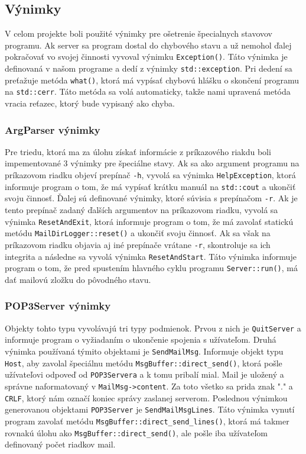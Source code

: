 \documentclass[a4paper, 11pt]{article}
\begin{document}
	
	\subsection{Výnimky}
	V celom projekte boli použité výnimky pre ošetrenie špecialnych stavovov programu. Ak server sa program dostal do chybového stavu a už nemohol ďalej pokračovať vo svojej činnosti vyvoval výnimku {\tt Exception()}. Táto výnimka je definovaná v našom programe a dedí z výnimky {\tt std::exception}. Pri dedení sa preťažuje metóda {\tt what()}, ktorá má vypísať chybovú hlášku o skončení programu na {\tt std::cerr}. Táto metóda sa volá automaticky, takže nami upravená metóda vracia reťazec, ktorý bude vypisaný ako chyba.
	
		\subsubsection{ArgParser výnimky}
		Pre triedu, ktorá ma za úlohu získať informácie z príkazového riakdu boli impementované 3 výnimky pre špeciálne stavy. Ak sa ako argument programu na príkazovom riadku objeví prepínač {\tt -h}, vyvolá sa výnimka {\tt HelpException}, ktorá informuje program o tom, že má vypísať krátku manuál na {\tt std::cout} a ukončiť svoju činnosť. Ďalej sú definované výnimky, ktoré súvisia s prepínačom {\tt -r}. Ak je tento prepínač zadaný ďalších argumentov na príkazovom riadku, vyvolá sa výnimka {\tt ResetAndExit}, ktorá informuje program o tom, že má zavolať statickú metódu {\tt MailDirLogger::reset()} a ukončiť svoju činnosť. Ak sa však na príkazovom riadku objavia aj iné prepínače vrátane {\tt -r}, skontroluje sa ich integrita a následne sa vyvolá výnimka {\tt ResetAndStart}. Táto výnimka informuje program o tom, že pred spustením hlavného cyklu programu {\tt Server::run()}, má dať mailovú zložku do pôvodného stavu.
		
		
		\subsubsection{POP3Server výnimky}
		Objekty tohto typu vyvolávajú tri typy podmienok. Prvou z nich je {\tt QuitServer} a informuje program o vyžiadaním o ukončenie spojenia s užívateľom. Druhá výnimka používaná týmito objektami je {\tt SendMailMsg}. Informuje objekt typu {\tt Host}, aby zavolal špeciálnu metódu {\tt MsgBuffer::direct\_send()}, ktorá pošle užívateľovi odpoveď od {\tt POP3Servera} a k tomu pribalí mial. Mail je uložený a správne naformatovaný v {\tt MailMsg->content}. Za toto všetko sa prida znak "." \space a {\tt CRLF}, ktorý nám označí koniec správy zaslanej serverom. Poslednou výnimkou generovanou objektami {\tt POP3Server} je {\tt SendMailMsgLines}. Táto výnimka vynutí program zavolať metódu {\tt MsgBuffer::direct\_send\_lines()}, ktorá má takmer rovnakú úlohu ako {\tt MsgBuffer::direct\_send()}, ale pošle iba užívateľom definovaný počet riadkov mail.
	
\end{document}
